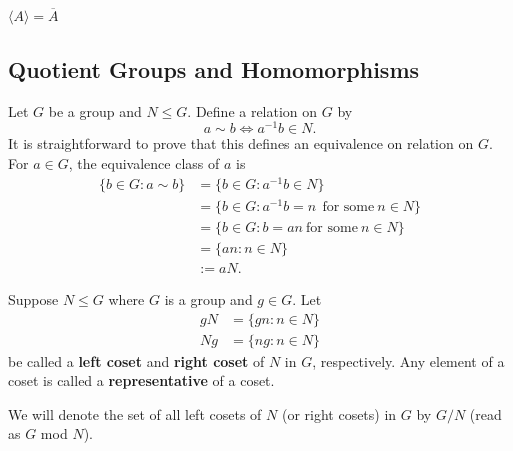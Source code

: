 \begin{prop}
    \( \langle A  \rangle = \overline{A} \)
\end{prop}

\subsection{Quotient Groups and Homomorphisms}

Let \( G  \) be a group and \( N \leq G  \). Define a relation on \( G  \) by 
\[  a \sim b \iff a^{-1} b \in N.  \]
It is straightforward to prove that this defines an equivalence on relation on \( G  \). For \( a \in G  \), the equivalence class of \( a  \) is 
\begin{align*}
    \{ b \in G : a \sim b \} &= \{  b \in G : a^{-1} b \in N  \}  \\
                             &= \{  b \in G : a^{-1} b = n  \ \ \text{for some} \ n \in N  \} \\
                             &= \{  b \in G : b = an \ \text{for some} \ n \in N \}  \\
                             &= \{ an : n \in N \} \\
                             &:= aN.
\end{align*}

\begin{definition}[Cosets]
    Suppose \( N \leq G  \) where \( G  \) is a group and \( g \in G  \). Let 
    \begin{align*}
        gN &= \{  g n : n \in N \}  \\
        Ng &= \{  ng : n \in N  \}
    \end{align*}
    be called a \textbf{left coset} and \textbf{right coset} of \( N  \) in \( G  \), respectively. Any element of a coset is called a \textbf{representative} of a coset.
\end{definition}

We will denote the set of all left cosets of \( N  \) (or right cosets) in \( G  \) by \( G / N  \) (read as \( G  \) mod \( N  \)).

